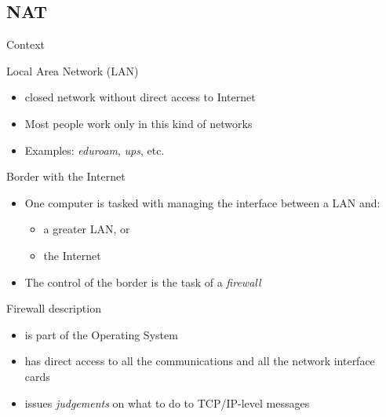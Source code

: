 \usepackage{ifthen}


\def\txthl#1{ \ifthenelse{\lengthtest{#1 pt<0.5pt}}{\top}{\bot} }



\begin{reveals}
                
\maketitle


\section{NAT}

\begin{frame}[c]{Context}
  
  \begin{block}{Local Area Network (LAN)}
    \begin{itemize}
    \item closed network without direct access to Internet
    \item Most people work only in this kind of networks
    \item Examples: \textit{eduroam}, \emph{ups}, etc.
    \end{itemize}
  \end{block}

  \vfill

  \begin{block}{Border with the Internet}
    \begin{itemize}
    \item One computer is tasked with managing the interface between a
      LAN and:
      \begin{itemize}
      \item a greater LAN, or
      \item the Internet
      \end{itemize}
    \item The control of the border is the task of a \emph{firewall}
    \end{itemize}
  \end{block}

  \vfill

  \begin{block}{Firewall description}
    \begin{itemize}
    \item is part of the Operating System
    \item has direct access to all the communications and all the
      network interface cards
    \item issues \emph{judgements} on what to do to TCP/IP-level messages
    \end{itemize}
  \end{block}


\end{frame}
\end{reveals}
